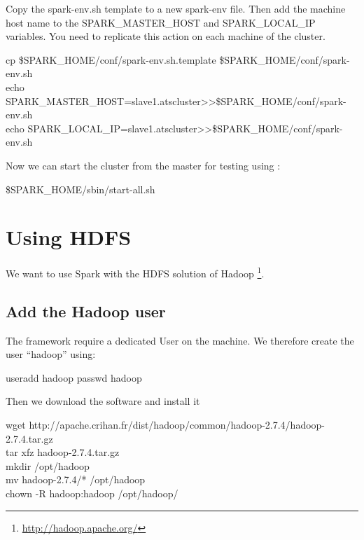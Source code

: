 \documentclass[a4paper]{article}
\begin{document}
\noindent Copy the spark-env.sh template to a new spark-env file. Then add the machine host name to the SPARK\_MASTER\_HOST and SPARK\_LOCAL\_IP variables. You need to replicate this action on  each machine of the cluster.
\begin{center}
\begin{tcolorbox}[width=\linewidth,colframe=black!5!white]
cp \$SPARK\_HOME/conf/spark-env.sh.template \$SPARK\_HOME/conf/spark-env.sh
\\echo \textquotesingle SPARK\_MASTER\_HOST=slave1.atscluster\textquotesingle \textgreater\textgreater \$SPARK\_HOME/conf/spark-env.sh
\\echo \textquotesingle SPARK\_LOCAL\_IP=slave1.atscluster\textquotesingle \textgreater\textgreater \$SPARK\_HOME/conf/spark-env.sh
\end{tcolorbox}
\end{center}

\noindent Now we can start the cluster from the master for testing using :
\begin{center}
\begin{tcolorbox}[width=0.8\linewidth,colframe=black!5!white]
\$SPARK\_HOME/sbin/start-all.sh
\end{tcolorbox}
\end{center}

\section{Using HDFS}

We want to use Spark with the HDFS solution of Hadoop \footnote{\url{http://hadoop.apache.org/}}.

\subsection{Add the Hadoop user}The framework require a dedicated User on the machine. We therefore create the user ``hadoop'' using:
\begin{center}
\begin{tcolorbox}[width=0.8\linewidth,colframe=black!5!white]
useradd hadoop
passwd hadoop
\end{tcolorbox}
\end{center}

\noindent Then we download the software and install it
\begin{center}
\begin{tcolorbox}[width=0.8\linewidth,colframe=black!5!white]
wget http://apache.crihan.fr/dist/hadoop/common/hadoop-2.7.4/hadoop-2.7.4.tar.gz
\\tar xfz hadoop-2.7.4.tar.gz
\\mkdir /opt/hadoop
\\mv hadoop-2.7.4/* /opt/hadoop
\\chown -R hadoop:hadoop /opt/hadoop/
\end{tcolorbox}
\end{center}
\end{document}
